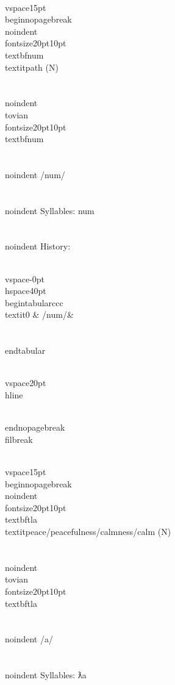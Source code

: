 \\vspace{15pt}
\\begin{nopagebreak}
\\noindent{\\fontsize{20pt}{10pt}\\textbf{num} } \\textit{path} (N)\\\\
\\noindent {\\tovian \\fontsize{20pt}{10pt} \\textbf{num} }\\\\
\\noindent /n{\textprimstress}um/\\\\
\\noindent Syllables: num\\\\


\\noindent History:

\\vspace{-0pt}
\\hspace{40pt}
\\begin{tabular}{ccc}
\\textit{0} & /num/& \\\\
\\end{tabular}

\\vspace{20pt}\\hline

\\end{nopagebreak}
\\filbreak



\\vspace{15pt}
\\begin{nopagebreak}
\\noindent{\\fontsize{20pt}{10pt}\\textbf{tla} } \\textit{peace/peacefulness/calmness/calm} (N)\\\\
\\noindent {\\tovian \\fontsize{20pt}{10pt} \\textbf{tla} }\\\\
\\noindent /{}{\textprimstress}a/\\\\
\\noindent Syllables: ƛa\\\\


